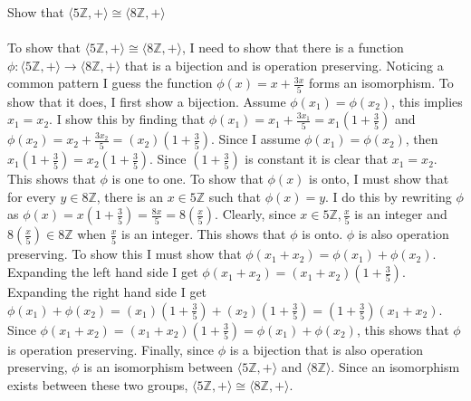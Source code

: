 \documentclass[titlepage]{article}
\newenvironment{problem}[2][Problem]{\begin{trivlist}
\item[\hskip \labelsep {\bfseries #1}\hskip \labelsep {\bfseries #2.}]}{\end{trivlist}}
\begin{document}
\begin{problem}{11}
Show that $\langle 5\mathbb{Z}, + \rangle \cong \langle 8\mathbb{Z}, + \rangle$
\\ \\
To show that $\langle 5\mathbb{Z}, + \rangle \cong \langle 8\mathbb{Z}, + \rangle$, I need to show that there is a function $\phi:\langle 5\mathbb{Z}, + \rangle \rightarrow \langle 8\mathbb{Z}, + \rangle$ that is a bijection and is operation preserving. Noticing a common pattern I guess the function $\phi(x) = x + \frac{3x}{5}$ forms an isomorphism. To show that it does, I first show a bijection. Assume $\phi(x_1)=\phi(x_2)$, this implies $x_1 = x_2.$ I show this by finding that $\phi(x_1) = x_1 + \frac{3x_1}{5} = x_1(1+\frac{3}{5})$ and $\phi(x_2) = x_2 + \frac{3x_2}{5} = (x_2)(1+\frac{3}{5})$. Since I assume $\phi(x_1)=\phi(x_2)$, then $x_1(1+\frac{3}{5}) = x_2(1+\frac{3}{5})$. Since $(1+\frac{3}{5})$ is constant it is clear that $x_1 = x_2$. This shows that $\phi$ is one to one. To show that $\phi(x)$ is onto, I must show that for every $y \in 8\mathbb{Z}$, there is an $ x \in 5\mathbb{Z}$ such that $\phi(x) = y$. I do this by rewriting $\phi$ as $\phi(x) = x(1+\frac{3}{5}) = \frac{8x}{5} = 8(\frac{x}{5})$. Clearly, since $x\in 5\mathbb{Z}, \frac{x}{5}$ is an integer and $8(\frac{x}{5}) \in 8\mathbb{Z}$ when $\frac{x}{5}$ is an integer. This shows that $\phi$ is onto. $\phi$ is also operation preserving. To show this I must show that $\phi(x_1 + x_2) = \phi(x_1) + \phi(x_2)$. Expanding the left hand side I get $\phi(x_1 + x_2) = (x_1+x_2)(1 + \frac{3}{5})$. Expanding the right hand side I get $\phi(x_1) + \phi(x_2) = (x_1)(1 + \frac{3}{5}) + (x_2)(1+\frac{3}{5}) = (1+\frac{3}{5})(x_1 + x_2)$. Since $\phi(x_1 + x_2) = (x_1 + x_2)(1 + \frac{3}{5}) = \phi(x_1) + \phi(x_2)$, this shows that $\phi$ is operation preserving. Finally, since $\phi$ is a bijection that is also operation preserving, $\phi$ is an isomorphism between $\langle 5\mathbb{Z},+ \rangle$ and $\langle 8\mathbb{Z} \rangle$. Since an isomorphism exists between these two groups, $\langle 5\mathbb{Z}, + \rangle \cong \langle 8\mathbb{Z}, + \rangle$.
\end{problem}
\end{document}
